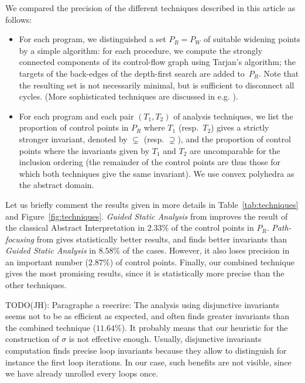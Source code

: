 \documentclass[preprint]{sigplanconf}
\newcommand{\JH}[1]{{\color{teal} TODO(JH): #1}}
\begin{document}
We compared the precision of the different techniques described in this article as follows:
\begin{itemize}
\item For each program, we distinguished a set $P_R = P_W$ of suitable widening points by a simple algorithm: for each procedure, we compute the strongly connected components of its control-flow graph using Tarjan's algorithm; the targets of the back-edges of the depth-first search are added to~$P_R$. Note that the resulting set is not necessarily minimal, but is sufficient to disconnect all cycles.
(More sophisticated techniques are discussed in e.g. \citet{BourdonclePhd}).

\item For each program and each pair $(T_1,T_2)$ of analysis techniques, we list
	the proportion of control points in $P_R$ where $T_1$ (resp.~$T_2$) gives a
	strictly stronger invariant, denoted by $\subsetneq$ (resp. $\supsetneq$),
	and the proportion of control points where the invariants given by $T_1$ and
	$T_2$ are uncomparable for the inclusion ordering (the remainder of the
	control points are thus those for which both techniques give the same
	invariant). We use convex polyhedra as the abstract domain.
\end{itemize}


Let us briefly comment the results given in more details in Table~\ref{tab:techniques} and Figure~\ref{fig:techniques}.
\emph{Guided Static Analysis} from \citet{DBLP:conf/sas/GopanR07} improves the
result of the classical Abstract Interpretation in $2.33\%$ of the control points
in $P_R$.
\emph{Path-focusing} from \citet{Monniaux_Gonnord_SAS11} gives
statistically better results, and finds better invariants than \emph{Guided
Static Analysis} in $8.58\%$ of the cases. However, it also loses precision in an
important number ($2.87\%$) of control points.
Finally, our combined technique gives the most promising results, since it is
statistically more precise than the other techniques.

\JH{Paragraphe a reecrire:}
The analysis using disjunctive invariants seems not to be as efficient as
expected, and often finds greater invariants than the combined technique
($11.64\%$). It probably means that our heuristic for the construction of
$\sigma$ is not effective enough. Usually, disjunctive invariants computation
finds precise loop invariants because they allow to distinguish for
instance the first loop iterations. In our case, such benefits are not
visible, since we have already unrolled every loops once.
\end{document}
